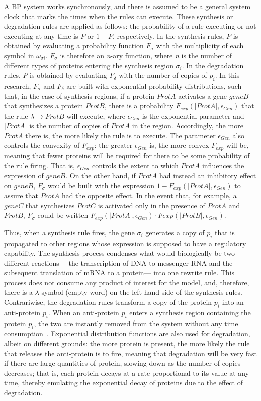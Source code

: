 \documentclass[runningheads,a4paper]{llncs}
\begin{document}
A BP system works synchronously, and there is assumed to be a general system clock that marks the times when the rules can execute. These synthesis or degradation rules are applied as follows: the probability of a rule executing or not executing at any time is $P$ or $1-P$, respectively. In the synthesis rules, $P$ is obtained by evaluating a probability function $F_\sigma$ with the multiplicity of each symbol in $\omega_{\sigma i}$. $F_\sigma$ is therefore an \textit{n}-ary function, where \textit{n} is the number of different types of proteins entering the synthesis region $\sigma_i$. In the degradation rules, $P$ is obtained by evaluating $F_\delta$ with the number of copies of $p_i$. In this research, $F_\sigma$ and $F_\delta$ are built with exponential probability distributions, such that, in the case of synthesis regions, if a protein $ProtA$ activates a gene $geneB$ that synthesizes a protein $ProtB$, there is a probability $F_{exp}(|ProtA|, \epsilon_{Gen})$ that the rule $\lambda \rightarrow ProtB$ will execute, where $\epsilon_{Gen}$ is the exponential parameter and $|ProtA|$ is the number of copies of $ProtA$ in the region. Accordingly, the more $ProtA$ there is, the more likely the rule is to execute. The parameter $\epsilon_{Gen}$ also controls the convexity of $F_{exp}$: the greater $\epsilon_{Gen}$ is, the more convex $F_{exp}$ will be, meaning that fewer proteins will be required for there to be some probability of the rule firing. That is, $\epsilon_{Gen}$ controls the extent to which $ProtA$ influences the expression of $geneB$. On the other hand, if $ProtA$ had instead an inhibitory effect on $geneB$, $F_\sigma$ would be built with the expression $1-F_{exp}(|ProtA|, \epsilon_{Gen})$ to assure that $ProtA$ had the opposite effect. In the event that, for example, a $geneC$ that synthesizes $ProtC$ is activated only in the presence of $ProtA$ and $ProtB$, $F_\sigma$ could be written $F_{exp}(|ProtA|, \epsilon_{Gen}) \cdot F{exp}(|ProtB|, \epsilon_{Gen})$.

Thus, when a synthesis rule fires, the gene $\sigma_i$ generates a copy of $p_i$ that is propagated to other regions whose expression is supposed to have a regulatory capability. The synthesis process condenses what would biologically be two different reactions ---the transcription of DNA to messenger RNA and the subsequent translation of mRNA to a protein--- into one rewrite rule. This process does not consume any product of interest for the model, and, therefore, there is a $\lambda$ symbol (empty word) on the left-hand side of the synthesis rules. Contrariwise, the degradation rules transform a copy of the protein $p_i$ into an anti-protein $\bar{p}_i$. When an anti-protein $\bar{p}_i$ enters a synthesis region containing the protein $p_i$, the two are instantly removed from the system without any time consumption~\cite{Pan2009}. Exponential distribution functions are also used for degradation, albeit on different grounds: the more protein is present, the more likely the rule that releases the anti-protein is to fire, meaning that degradation will be very fast if there are large quantities of protein, slowing down as the number of copies decreases; that is, each protein decays at a rate proportional to its value at any time, thereby emulating the exponential decay of proteins due to the effect of degradation.
%
\end{document}

